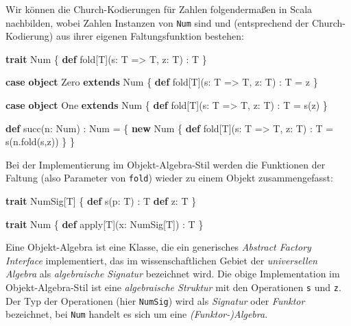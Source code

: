 \documentclass[]{article}
\newenvironment{Shaded}{}{}
\newcommand{\FunctionTok}[1]{\textcolor[rgb]{0.02,0.16,0.49}{#1}}
\newcommand{\KeywordTok}[1]{\textcolor[rgb]{0.00,0.44,0.13}{\textbf{#1}}}
\newcommand{\NormalTok}[1]{#1}
\begin{document}
Wir können die Church-Kodierungen für Zahlen folgendermaßen in Scala
nachbilden, wobei Zahlen Instanzen von \texttt{Num} sind und
(entsprechend der Church-Kodierung) aus ihrer eigenen Faltungsfunktion
bestehen:

\begin{Shaded}
\begin{Highlighting}[]
\KeywordTok{trait}\NormalTok{ Num \{}
  \KeywordTok{def}\NormalTok{ fold[T](s: T =\textgreater{} T, z: T) : T}
\NormalTok{\}}

\KeywordTok{case} \KeywordTok{object}\NormalTok{ Zero }\KeywordTok{extends}\NormalTok{ Num \{}
  \KeywordTok{def}\NormalTok{ fold[T](s: T =\textgreater{} T, z: T) : T = z}
\NormalTok{\}}

\KeywordTok{case} \KeywordTok{object}\NormalTok{ One }\KeywordTok{extends}\NormalTok{ Num \{}
  \KeywordTok{def}\NormalTok{ fold[T](s: T =\textgreater{} T, z: T) : T = }\FunctionTok{s}\NormalTok{(z)}
\NormalTok{\}}

\KeywordTok{def} \FunctionTok{succ}\NormalTok{(n: Num) : Num = \{}
  \KeywordTok{new}\NormalTok{ Num \{}
    \KeywordTok{def}\NormalTok{ fold[T](s: T =\textgreater{} T, z: T) : T = }\FunctionTok{s}\NormalTok{(n.}\FunctionTok{fold}\NormalTok{(s,z))}
\NormalTok{  \}}
\NormalTok{\}}
\end{Highlighting}
\end{Shaded}

Bei der Implementierung im Objekt-Algebra-Stil werden die Funktionen der
Faltung (also Parameter von \texttt{fold}) wieder zu einem Objekt
zusammengefasst:

\begin{Shaded}
\begin{Highlighting}[]
\KeywordTok{trait}\NormalTok{ NumSig[T] \{}
  \KeywordTok{def} \FunctionTok{s}\NormalTok{(p: T) : T}
  \KeywordTok{def}\NormalTok{ z: T}
\NormalTok{\}}

\KeywordTok{trait}\NormalTok{ Num \{ }\KeywordTok{def}\NormalTok{ apply[T](x: NumSig[T]) : T \}}
\end{Highlighting}
\end{Shaded}

Eine Objekt-Algebra ist eine Klasse, die ein generisches \emph{Abstract
Factory Interface} implementiert, das im wissenschaftlichen Gebiet der
\emph{universellen Algebra} als \emph{algebraische Signatur} bezeichnet
wird. Die obige Implementation im Objekt-Algebra-Stil ist eine
\emph{algebraische Struktur} mit den Operationen \texttt{s} und
\texttt{z}. Der Typ der Operationen (hier \texttt{NumSig}) wird als
\emph{Signatur} oder \emph{Funktor} bezeichnet, bei \texttt{Num} handelt
es sich um eine \emph{(Funktor-)Algebra}.
\end{document}
